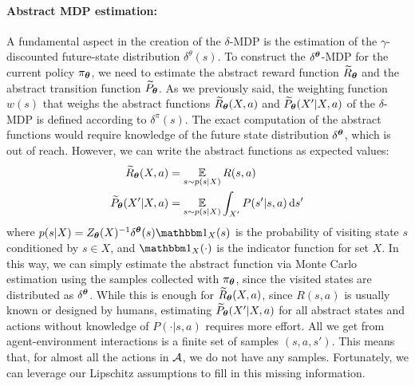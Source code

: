 \paragraph{Abstract MDP estimation:}\label{sec:mdpest}
A fundamental aspect in the creation of the $\delta$-\ac{MDP} is the estimation of the $\gamma$-discounted future-state distribution $\delta^{\theta}(s)$.
To construct the $\delta^{\boldsymbol{\theta}}$-\ac{MDP} for the current policy $\pi_{\boldsymbol{\theta}}$, we need to estimate the abstract reward function $\widetilde{R}_{\boldsymbol{\theta}}$ and the abstract transition function $\widetilde{P}_{\boldsymbol{\theta}}$. As we previously said, the weighting function $w(s)$ that weighs the abstract functions $\widetilde{R}_{\boldsymbol{\theta}}(X, a)$ and $\widetilde{P}_{\boldsymbol{\theta}}(X'|X, a)$ of the $\delta$-MDP is defined according to $\delta^{\pi}(s)$. The exact computation of the abstract functions would require knowledge of the future state distribution $\delta^{\boldsymbol{\theta}}$, which is out of reach. 
However, we can write the abstract functions as expected values:
\begin{align}
\widetilde{R}_{\boldsymbol{\theta}}(X, a) &= \operatorname*{\mathbb{E}}_{s \sim p(s | X)} R(s, a) \label{eq:mcr}\\
\widetilde{P}_{\boldsymbol{\theta}}(X' | X, a) &= \operatorname*{\mathbb{E}}_{s \sim p(s | X)} \int_{X'} P(s' | s, a) \,\mathrm{d} s'\label{eq:mcp}
\end{align}
where $p(s | X) = Z_{\vtheta}(X)^{-1}\delta^{\vtheta}(s)\Ind_X(s)$ is the probability of visiting state $s$ conditioned by $s\in X$, and $\Ind_X(\cdot)$ is the indicator function for set $X$.
In this way, we can simply estimate the abstract function via Monte Carlo estimation using the samples collected with $\pi_{\boldsymbol{\theta}}$, since the visited states are distributed as $\delta^{\boldsymbol{\theta}}$.
While this is enough for $\widetilde{R}_{\boldsymbol{\theta}}(X, a)$, since $R(s, a)$ is usually known or designed by humans, estimating $\widetilde{P}_{\boldsymbol{\theta}}(X'|X, a)$ for all abstract states and actions without knowledge of $P(\cdot|s, a)$ requires more effort. All we get from agent-environment interactions is a finite set of samples $(s,a,s')$. This means that, for almost all the actions in $\mathcal{A}$, we do not have any samples. Fortunately, we can leverage our Lipschitz assumptions to fill in this missing information.
